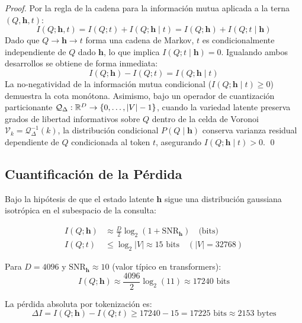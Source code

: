 \begin{proof}
Por la regla de la cadena para la información mutua aplicada a la terna $(Q, \mathbf{h}, t)$:
\begin{equation}
I(Q; \mathbf{h}, t) = I(Q; t) + I(Q; \mathbf{h} \mid t) = I(Q; \mathbf{h}) + I(Q; t \mid \mathbf{h})
\end{equation}
Dado que $Q \to \mathbf{h} \to t$ forma una cadena de Markov, $t$ es condicionalmente independiente de $Q$ dado $\mathbf{h}$,
lo que implica $I(Q; t \mid \mathbf{h}) = 0$. Igualando ambos desarrollos se obtiene de forma inmediata:
\begin{equation}
I(Q; \mathbf{h}) - I(Q; t) = I(Q; \mathbf{h} \mid t)
\end{equation}
La no-negatividad de la información mutua condicional ($I(Q; \mathbf{h} \mid t) \ge 0$) demuestra la cota monótona.
Asimismo, bajo un operador de cuantización particionante $\mathcal{Q}_\Delta: \mathbb{R}^D \to \{0, \dots, |V|-1\}$,
cuando la variedad latente preserva grados de libertad informativos sobre $Q$ dentro de la celda de Voronoi
$\mathcal{V}_k = \mathcal{Q}_\Delta^{-1}(k)$, la distribución condicional $P(Q \mid \mathbf{h})$ conserva varianza
residual dependiente de $Q$ condicionada al token $t$, asegurando $I(Q; \mathbf{h} \mid t) > 0$. \qed
\end{proof}

\subsection{Cuantificación de la Pérdida}

Bajo la hipótesis de que el estado latente $\mathbf{h}$ sigue una distribución
gaussiana isotrópica en el subespacio de la consulta:

\begin{align}
I(Q; \mathbf{h}) &\approx \frac{D}{2} \log_2\left(1 + \text{SNR}_{\mathbf{h}}\right) \quad \text{(bits)} \\
I(Q; t) &\le \log_2 |V| \approx 15 \text{ bits} \quad (|V| = 32768)
\end{align}

Para $D = 4096$ y $\text{SNR}_{\mathbf{h}} \approx 10$ (valor típico en transformers):
\begin{equation}
I(Q; \mathbf{h}) \approx \frac{4096}{2} \log_2(11) \approx 17240 \text{ bits}
\end{equation}

La pérdida absoluta por tokenización es:
\begin{equation}
\Delta I = I(Q; \mathbf{h}) - I(Q; t) \ge 17240 - 15 = 17225 \text{ bits} \approx 2153 \text{ bytes}
\end{equation}

